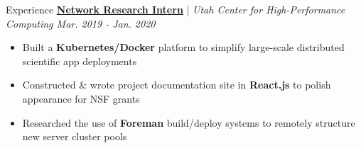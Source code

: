 \documentclass{resume/resume}
\begin{document}
\begin{rSection}{Experience}
  \href{https://slateci.io/}{\bf Network Research Intern} | {\em Utah Center for High-Performance Computing \hfill Mar. 2019 - Jan. 2020}
  \vspace{-6pt}
  \begin{itemize}[nosep]
    \item Built a {\bf Kubernetes/Docker} platform to simplify large-scale distributed scientific app deployments
    \item Constructed \& wrote project documentation site in {\bf React.js} to polish appearance for NSF grants
    \item Researched the use of {\bf Foreman} build/deploy systems to remotely structure new server cluster pools
  \end{itemize}
  
  

  

\end{rSection}
\end{document}

